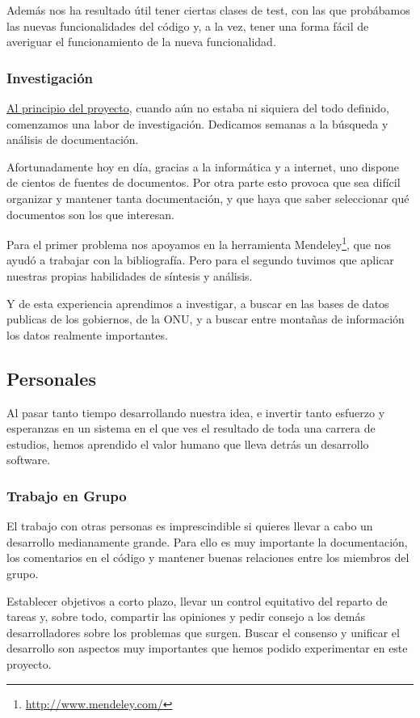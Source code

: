 Además nos ha resultado útil tener ciertas clases de test, con las que
probábamos las nuevas funcionalidades del código y, a la vez, tener una forma
fácil de averiguar el funcionamiento de la nueva funcionalidad.

\subsubsection{Investigación}

\hyperref[inicios]{Al principio del proyecto}, cuando aún no estaba ni siquiera
del todo definido, comenzamos una labor de investigación. Dedicamos semanas a
la búsqueda y análisis de documentación.

Afortunadamente hoy en día, gracias a la informática y a internet, uno dispone
de cientos de fuentes de documentos. Por otra parte esto provoca que sea
difícil organizar y mantener tanta documentación, y que haya que saber
seleccionar qué documentos son los que interesan.

Para el primer problema nos apoyamos en la herramienta
Mendeley\footnote{\url{http://www.mendeley.com/}}, que nos ayudó a trabajar con
la bibliografía. Pero para el segundo tuvimos que aplicar nuestras propias
habilidades de síntesis y análisis.

Y de esta experiencia aprendimos a investigar, a buscar en las bases de datos
publicas de los gobiernos, de la ONU, y a buscar entre montañas de información
los datos realmente importantes.

\subsection{Personales}

Al pasar tanto tiempo desarrollando nuestra idea, e invertir tanto esfuerzo y
esperanzas en un sistema en el que ves el resultado de toda una carrera de
estudios, hemos aprendido el valor humano que lleva detrás un desarrollo
software.

\subsubsection{Trabajo en Grupo}

El trabajo con otras personas es imprescindible si quieres llevar a cabo un
desarrollo medianamente grande. Para ello es muy importante la documentación,
los comentarios en el código y mantener buenas relaciones entre los miembros del
grupo.

Establecer objetivos a corto plazo, llevar un control equitativo del reparto de
tareas y, sobre todo, compartir las opiniones y pedir consejo a los demás
desarrolladores sobre los problemas que surgen. Buscar el consenso y unificar el
desarrollo son aspectos muy importantes que hemos podido experimentar en este
proyecto.

